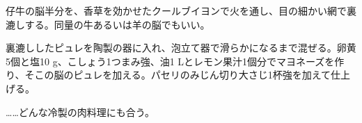 \begin{recette}


仔牛の脳半分を、香草を効かせたクールブイヨンで火を通し、目の細かい網で裏漉しする。同量の牛あるいは羊の脳でもいい。

裏漉ししたピュレを陶製の器に入れ、泡立て器で滑らかになるまで混ぜる。卵黄5個と塩10
g、こしょう1つまみ強、油1
Lとレモン果汁1個分でマヨネーズを作り、そこの脳のピュレを加える。パセリのみじん切り大さじ1杯強を加えて仕上げる。

\ldots{}\ldots{}どんな冷製の肉料理にも合う。

\atoaki{}

\hypertarget{mayonnaise}{%
}
\end{recette}
